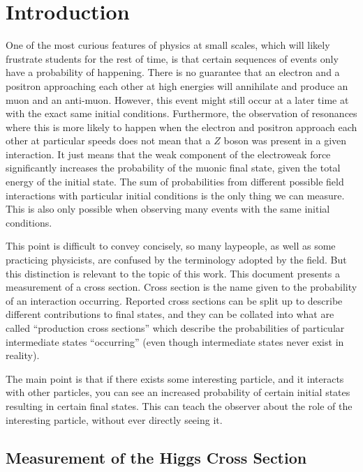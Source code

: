 \chapter{Introduction} \label{ch:intro}

One of the most curious features of physics at small scales, which will likely frustrate students for the rest of time, is that certain sequences of events only have a probability of happening.
There is no guarantee that an electron and a positron approaching each other at high energies will annihilate and produce an muon and an anti-muon.
However, this event might still occur at a later time at with the exact same initial conditions.
Furthermore, the observation of resonances where this is more likely to happen when the electron and positron approach each other at particular speeds does not mean that a $Z$ boson was present in a given interaction.
It just means that the weak component of the electroweak force significantly increases the probability of the muonic final state, given the total energy of the initial state.
The sum of probabilities from different possible field interactions with particular initial conditions is the only thing we can measure.
This is also only possible when observing many events with the same initial conditions.

This point is difficult to convey concisely, so many laypeople, as well as some practicing physicists, are confused by the terminology adopted by the field.
But this distinction is relevant to the topic of this work.
This document presents a measurement of a cross section.
Cross section is the name given to the probability of an interaction occurring.
Reported cross sections can be split up to describe different contributions to final states, and they can be collated into what are called ``production cross sections'' which describe the probabilities of particular intermediate states ``occurring'' (even though intermediate states never exist in reality).

The main point is that if there exists some interesting particle, and it interacts with other particles, you can see an increased probability of certain initial states resulting in certain final states.
This can teach the observer about the role of the interesting particle, without ever directly seeing it.


\section{Measurement of the Higgs Cross Section}

